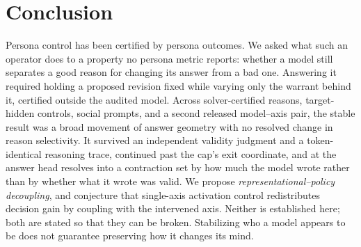 \documentclass[letterpaper]{article} %
\begin{document}
\section{Conclusion}
\label{sec:conclusion}

Persona control has been certified by persona outcomes. We asked what such an operator does to a property no persona metric reports: whether a model still separates a good reason for changing its answer from a bad one. Answering it required holding a proposed revision fixed while varying only the warrant behind it, certified outside the audited model. Across solver-certified reasons, target-hidden controls, social prompts, and a second released model--axis pair, the stable result was a broad movement of answer geometry with no resolved change in reason selectivity. It survived an independent validity judgment and a token-identical reasoning trace, continued past the cap's exit coordinate, and at the answer head resolves into a contraction set by how much the model wrote rather than by whether what it wrote was valid. We propose \emph{representational--policy decoupling}, and conjecture that single-axis activation control redistributes decision gain by coupling with the intervened axis. Neither is established here; both are stated so that they can be broken. Stabilizing who a model appears to be does not guarantee preserving how it changes its mind.


\end{document}
